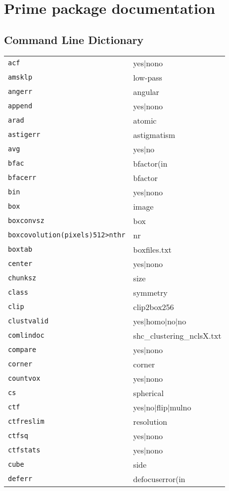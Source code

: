 \documentclass[review]{elsarticle}
\begin{document}
\section{Prime package documentation}

\subsection{Command Line Dictionary}
\begin{tabular}{ll}
\texttt{acf}&{yes|no{no}}\\
\texttt{amsklp}&{low-pass}\\
\texttt{angerr}&{angular}\\
\texttt{append}&{yes|no{no}}\\
\texttt{arad}&{atomic}\\
\texttt{astigerr}&{astigmatism}\\
\texttt{avg}&{yes|no}\\
\texttt{bfac}&{bfactor(in}\\
\texttt{bfacerr}&{bfactor}\\
\texttt{bin}&{yes|no{no}}\\
\texttt{box}&{image}\\
\texttt{boxconvsz}&{box}\\
\texttt{boxcovolution(pixels){512}>nthr}&{nr}\\
\texttt{boxtab}&{boxfiles.txt}\\
\texttt{center}&{yes|no{no}}\\
\texttt{chunksz}&{size}\\
\texttt{class}&{symmetry}\\
\texttt{clip}&{clip2box{256}}\\
\texttt{clustvalid}&{yes|homo|no|{no}}\\
\texttt{comlindoc}&{shc\_clustering\_nclsX.txt}\\
\texttt{compare}&{yes|no{no}}\\
\texttt{corner}&{corner}\\
\texttt{countvox}&{yes|no{no}}\\
\texttt{cs}&{spherical}\\
\texttt{ctf}&{yes|no|flip|mul{no}}\\
\texttt{ctfreslim}&{resolution}\\
\texttt{ctfsq}&{yes|no{no}}\\
\texttt{ctfstats}&{yes|no{no}}\\
\texttt{cube}&{side}\\
\texttt{deferr}&{defocuserror(in}\\

\end{tabular}
\end{document}
